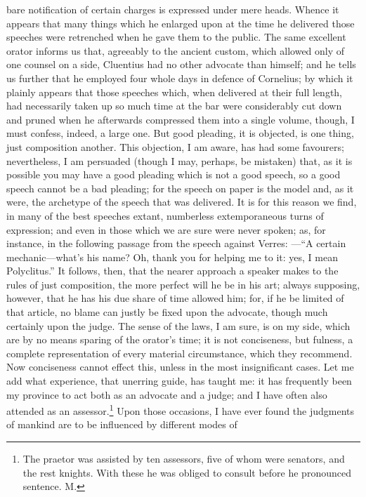 bare notification of certain charges is expressed under mere heads. Whence
it appears that many things which he enlarged upon at the time he
delivered those speeches were retrenched when he gave them to the public.
The same excellent orator informs us that, agreeably to the ancient
custom, which allowed only of one counsel on a side, Cluentius had no
other advocate than himself; and he tells us further that he employed four
whole days in defence of Cornelius; by which it plainly appears that those
speeches which, when delivered at their full length, had necessarily taken
up so much time at the bar were considerably cut down and pruned when he
afterwards compressed them into a single volume, though, I must confess,
indeed, a large one. But good pleading, it is objected, is one thing, just
composition another. This objection, I am aware, has had some favourers;
nevertheless, I am persuaded (though I may, perhaps, be mistaken) that, as
it is possible you may have a good pleading which is not a good speech, so
a good speech cannot be a bad pleading; for the speech on paper is the
model and, as it were, the archetype of the speech that was delivered. It
is for this reason we find, in many of the best speeches extant,
numberless extemporaneous turns of expression; and even in those which we
are sure were never spoken; as, for instance, in the following passage
from the speech against Verres: —``A certain mechanic—what's
his name? Oh, thank you for helping me to it: yes, I mean Polyclitus.'' It
follows, then, that the nearer approach a speaker makes to the rules of
just composition, the more perfect will he be in his art; always
supposing, however, that he has his due share of time allowed him; for, if
he be limited of that article, no blame can justly be fixed upon the
advocate, though much certainly upon the judge. The sense of the laws, I
am sure, is on my side, which are by no means sparing of the orator's
time; it is not conciseness, but fulness, a complete representation of
every material circumstance, which they recommend. Now conciseness cannot
effect this, unless in the most insignificant cases. Let me add what
experience, that unerring guide, has taught me: it has frequently been my
province to act both as an advocate and a judge; and I have often also
attended as an assessor.\footnote{The praetor was assisted
by ten assessors, five of whom were senators, and the rest knights. With
these he was obliged to consult before he pronounced sentence. M.} Upon those occasions, I have ever found the
judgments of mankind are to be influenced by different modes of

